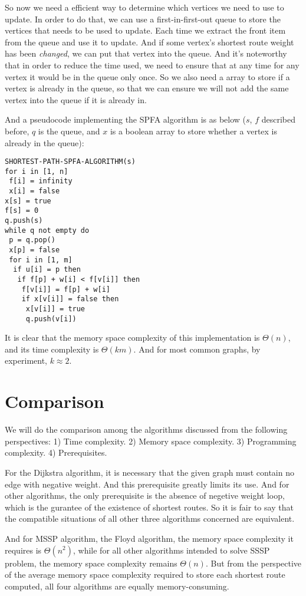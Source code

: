 \documentclass[a4paper,11pt,twocolumn]{article}
\begin{document}
So now we need a efficient way to determine which vertices we need to use to update. In order to do that, we can use a first-in-first-out queue to store the vertices that needs to be used to update. Each time we extract the front item from the queue and use it to update. And if some vertex's shortest route weight has been \emph{changed}, we can put that vertex into the queue. And it's noteworthy that in order to reduce the time used, we need to ensure that at any time for any vertex it would be in the queue only once. So we also need a array to store if a vertex is already in the queue, so that we can ensure we will not add the same vertex into the queue if it is already in. 

And a pseudocode implementing the SPFA algorithm is as below ($s$, $f$ described before, $q$ is the queue, and $x$ is a boolean array to store whether a vertex is already in the queue):

\begin{verbatim}
SHORTEST-PATH-SPFA-ALGORITHM(s)
for i in [1, n]
 f[i] = infinity
 x[i] = false
x[s] = true
f[s] = 0
q.push(s)
while q not empty do
 p = q.pop()
 x[p] = false
 for i in [1, m]
  if u[i] = p then
   if f[p] + w[i] < f[v[i]] then
    f[v[i]] = f[p] + w[i]
    if x[v[i]] = false then
     x[v[i]] = true
     q.push(v[i])
\end{verbatim}

It is clear that the memory space complexity of this implementation is $\Theta(n)$, and its time complexity is $\Theta(km)$. And for most common graphs, by experiment, $k\approx 2$. 

\section{Comparison}

We will do the comparison among the algorithms discussed from the following perspectives: 1) Time complexity. 2) Memory space complexity. 3) Programming complexity. 4) Prerequisites. 

For the Dijkstra algorithm, it is necessary that the given graph must contain no edge with negative weight. And this prerequisite greatly limits its use. And for other algorithms, the only prerequisite is the absence of negetive weight loop, which is the gurantee of the existence of shortest routes. So it is fair to say that the compatible situations of all other three algorithms concerned are equivalent. 

And for MSSP algorithm, the Floyd algorithm, the memory space complexity it requires is $\Theta(n^2)$, while for all other algorithms intended to solve SSSP problem, the memory space complexity remains $\Theta(n)$. But from the perspective of the average memory space complexity required to store each shortest route computed, all four algorithms are equally memory-consuming. 
\end{document}
